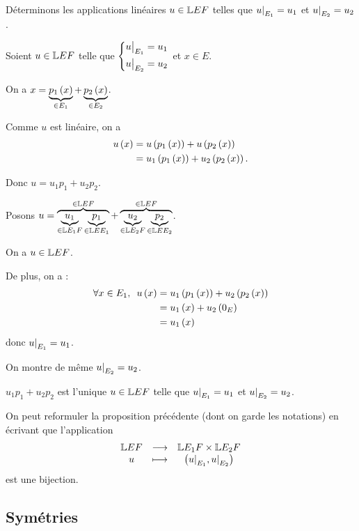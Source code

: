\begin{dem}
Déterminons les applications linéaires \(u\in\mathbb{L}{E}{F}\) telles que \(\restr{u}{E_1}=u_1\) et \(\restr{u}{E_2}=u_2\).

\analyse

Soient \(u\in\mathbb{L}{E}{F}\) telle que \(\begin{dcases}\restr{u}{E_1}=u_1 \\ \restr{u}{E_2}=u_2\end{dcases}\) et \(x\in E\).

On a \(x=\underbrace{p_1\left(x\right)}_{\in E_1}+\underbrace{p_2\left(x\right)}_{\in E_2}\).

Comme \(u\) est linéaire, on a \[\begin{aligned}
u\left(x\right)&=u\left(p_1\left(x\right)\right)+u\left(p_2\left(x\right)\right) \\
&=u_1\left(p_1\left(x\right)\right)+u_2\left(p_2\left(x\right)\right).
\end{aligned}\]

Donc \(u=u_1p_1+u_2p_2\).

\synthese

Posons \(u=\overbrace{\underbrace{u_1}_{\in\mathbb{L}{E_1}{F}}\underbrace{p_1}_{\in\mathbb{L}{E}{E_1}}}^{\in\mathbb{L}{E}{F}}+\overbrace{\underbrace{u_2}_{\in\mathbb{L}{E_2}{F}}\underbrace{p_2}_{\in\mathbb{L}{E}{E_2}}}^{\in\mathbb{L}{E}{F}}\).

On a \(u\in\mathbb{L}{E}{F}\).

De plus, on a : \[\begin{aligned}
\quantifs{\forall x\in E_1}u\paren{x}&=u_1\paren{p_1\paren{x}}+u_2\paren{p_2\paren{x}} \\
&=u_1\paren{x}+u_2\paren{0_E} \\
&=u_1\paren{x}
\end{aligned}\] donc \(\restr{u}{E_1}=u_1\).

On montre de même \(\restr{u}{E_2}=u_2\).

\conclusion

\(u_1p_1+u_2p_2\) est l'unique \(u\in\mathbb{L}{E}{F}\) telle que \(\restr{u}{E_1}=u_1\) et \(\restr{u}{E_2}=u_2\).
\end{dem}

\begin{rem}
On peut reformuler la proposition précédente (dont on garde les notations) en écrivant que l'application \[\fonctionlambda{\L{E}{F}}{\L{E_1}{F}\times\L{E_2}{F}}{u}{\paren{\restr{u}{E_1},\restr{u}{E_2}}}\] est une bijection.
\end{rem}

\subsection{Symétries}

